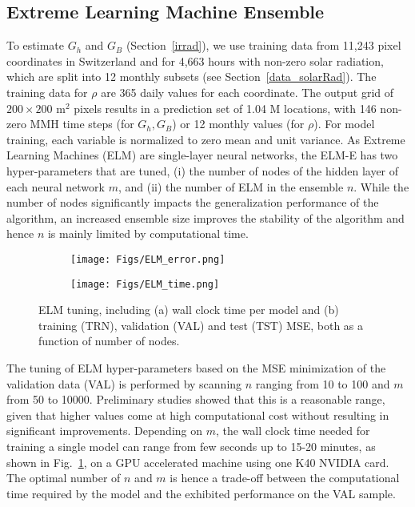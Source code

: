\subsection*{Extreme Learning Machine Ensemble}
\label{app:tune_ELM}

To estimate $G_h$ and $G_B$ (Section~\ref{irrad}), we use training data from 11,243 pixel coordinates in Switzerland and for 4,663 hours with non-zero solar radiation, which are split into 12 monthly subsets (see Section~\ref{data_solarRad}).
The training data for $\rho$ are 365 daily values for each coordinate. 
The output grid of $200 \times 200$ m$^2$ pixels results in a prediction set of 1.04 M locations, with 146 non-zero MMH time steps (for $G_h, G_B$) or 12 monthly values (for $\rho$).  For model training, each variable is normalized to zero mean and unit variance.
%
As Extreme Learning Machines (ELM) are single-layer neural networks, the ELM-E has two hyper-parameters that are tuned, (i) the number of nodes of the hidden layer of each neural network $m$, and (ii) the number of ELM in the ensemble $n$. While the number of nodes significantly impacts the generalization performance of the algorithm, an increased ensemble size improves the stability of the algorithm and hence $n$ is mainly limited by computational time. %

\begin{figure}[tb]
\centering
\begin{subfigure}{.49\textwidth}
  \centering
  \texttt{[image: Figs/ELM\_error.png]}  
  \caption{}
  \label{figa:ELM_training}
\end{subfigure}
\begin{subfigure}{.49\textwidth}
  \centering
  \texttt{[image: Figs/ELM\_time.png]}  
  \caption{}
  \label{figb:ELM_training}
\end{subfigure}
\caption{ELM tuning, including (a) wall clock time per model and (b) training (TRN), validation (VAL) and test (TST) MSE, both as a function of number of nodes.}
\label{fig:ELM_training}
\end{figure}

The tuning of ELM hyper-parameters based on the MSE minimization of the validation data (VAL) is performed by scanning $n$ ranging from 10 to 100 and $m$ from 50 to 10000. Preliminary studies showed that this is a reasonable range, given that higher values come at high computational cost without resulting in significant improvements. Depending on $m$, the wall clock time needed for training a single model can range from few seconds up to 15-20 minutes, as shown in Fig.~\ref{figa:ELM_training}, on a GPU accelerated machine using one K40 NVIDIA card. The optimal number of $n$ and $m$ is hence a trade-off between the computational time required by the model and the exhibited performance on the VAL sample.

